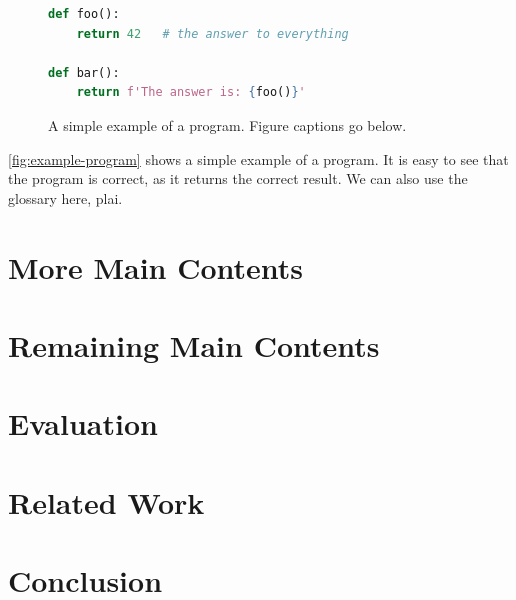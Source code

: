 \documentclass[thesis]{plai}
\begin{document}
\begin{figure}[t]
\begin{lstlisting}[language=Python]
def foo():
    return 42   # the answer to everything

def bar():
    return f'The answer is: {foo()}'
\end{lstlisting}
\caption{A simple example of a program. Figure captions go below.}
\label{fig:example-program}
\end{figure}

\autoref{fig:example-program} shows a simple example of a program.
It is easy to see that the program is correct, as it returns the correct result.
We can also use the glossary here, \gls{plai}.

\section{More Main Contents}
\label{sec:transfer}

\lipsum[2-3]


\section{Remaining Main Contents}
\label{sec:remaining}

\lipsum[2-3]

\section{Evaluation}
\label{sec:evaluation}



\section{Related Work}
\label{sec:related-work}



\section{Conclusion}
\label{sec:conclusion}






\pagebreak



\pagebreak

\listoffigures{}
\listoftables{}

\pagebreak

\printglossaries
\end{document}
